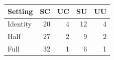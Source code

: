 \begin{tabular}{lrrrr}
\toprule
Setting & SC & UC & SU & UU\\
\midrule
Identity & 20 & 4 & 12 & 4 \\
Half & 27 & 2 & 9 & 2 \\
Full & 32 & 1 & 6 & 1 \\
\bottomrule
\end{tabular}
